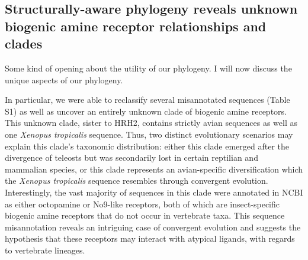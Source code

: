 \documentclass[fleqn,10pt]{wlpeerj}
\begin{document}
\subsection*{Structurally-aware phylogeny reveals unknown biogenic amine receptor relationships and clades}

Some kind of opening about the utility of our phylogeny. I will now discuss the unique aspects of our phylogeny.

In particular, we were able to reclassify several misannotated sequences (Table S1) as well as uncover an entirely unknown clade of biogenic amine receptors. This unknown clade, sister to HRH2, contains strictly avian sequences as well as one \emph{Xenopus tropicalis} sequence. Thus, two distinct evolutionary scenarios may explain this clade's taxonomic distribution: either this clade emerged after the divergence of teleosts but was secondarily lost in certain reptilian and mammalian species, or this clade represents an avian-specific diversification which the \emph{Xenopus tropicalis} sequence resembles through convergent evolution. Interestingly, the vast majority of sequences in this clade were annotated in NCBI as either octopamine or No9-like receptors, both of which are insect-specific biogenic amine receptors that do not occur in vertebrate taxa. This sequence misannotation reveals an intriguing case of convergent evolution and suggests the hypothesis that these receptors may interact with atypical ligands, with regards to vertebrate lineages.
\end{document}
